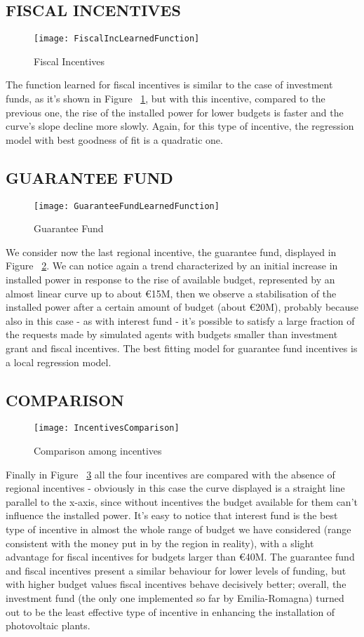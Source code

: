 \documentclass [twocolumn,a4paper,10pt]{ECMS}
\newcommand{\Subsection}[1]{\subsection*{#1}\vspace*{-0.7em}}
\begin{document}
\Subsection{FISCAL INCENTIVES}

\begin{figure}[hbt]
	\centering
	\texttt{[image: FiscalIncLearnedFunction]}
	\caption{Fiscal Incentives}
	\label{FiscalIncLearnedFunction}
\end{figure}

The function learned for fiscal incentives is similar to the case of investment funds, as it's shown in Figure ~\ref{FiscalIncLearnedFunction}, but with this incentive, compared to the previous one, the rise of the installed power for lower budgets is faster and the curve's slope decline more slowly. Again, for this type of incentive, the regression model with best goodness of fit is a quadratic one.

\Subsection{GUARANTEE FUND}

\begin{figure}[hbt]
	\centering
	\texttt{[image: GuaranteeFundLearnedFunction]}
	\caption{Guarantee Fund}
	\label{GuaranteeFundLearnedFunction}
\end{figure}

We consider now the last regional incentive, the guarantee fund, displayed in Figure ~\ref{GuaranteeFundLearnedFunction}. We can notice again a trend characterized by an initial increase in installed power in response to the rise of available budget, represented by an almost linear curve up to about \euro15M,	then we observe a stabilisation of the installed power after a certain amount of budget (about \euro20M), probably because also in this case - as with interest fund - it's possible to satisfy a large fraction of the requests made by simulated agents with budgets smaller than investment grant and fiscal incentives. The best fitting model for guarantee fund incentives is a local regression model. 

\Subsection{COMPARISON}

\begin{figure}[hbt]
	\centering
	\texttt{[image: IncentivesComparison]}
	\caption{Comparison among incentives}
	\label{IncentivesComparison}
\end{figure}

Finally in Figure ~\ref{IncentivesComparison} all the four incentives are compared with the absence of regional incentives - obviously in this case the curve displayed is a straight line parallel to the x-axis, since without incentives the budget available for them can't influence the installed power. It's easy to notice that interest fund is the best type of incentive in almost the whole range of budget we have considered (range consistent with the money put in by the region in reality), with a slight advantage for fiscal incentives for budgets larger than \euro40M. The guarantee fund and fiscal incentives present a similar behaviour for lower levels of funding, but with higher budget values fiscal incentives behave decisively better; overall, the investment fund (the only one implemented so far by Emilia-Romagna) turned out to be the least effective type of incentive in enhancing the installation of photovoltaic plants.
\end{document}
